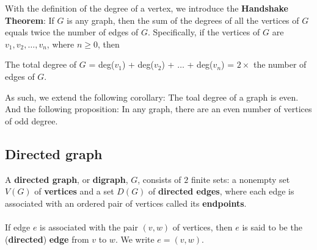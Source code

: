 \documentclass[a4paper]{article}
\begin{document}
With the definition of the degree of a vertex, we introduce the \textbf{Handshake Theorem}: If $G$ is any graph, then the sum of the degrees of all the vertices of $G$ equals twice the number of edges of $G$. Specifically, if the vertices of $G$ are $v_1, v_2, \dots, v_n$, where $n\ge 0$, then
\begin{center}
	The total degree of $G$ = deg($v_1$) + deg($v_2$) + $\dots$ + deg($v_n$) = $2 \times$ the number of edges of $G$.
\end{center}
As such, we extend the following corollary: The toal degree of a graph is even.\\
And the following proposition: In any graph, there are an even number of vertices of odd degree.

\subsection{Directed graph}
A \textbf{directed graph}, or \textbf{digraph}, $G$, consists of $2$ finite sets: a nonempty set $V(G)$ of \textbf{vertices} and a set $D(G)$ of \textbf{directed edges}, where each edge is associated with an ordered pair of vertices called its \textbf{endpoints}.\\\\
If edge $e$ is associated with the pair $(v,w)$ of vertices, then $e$ is said to be the (\textbf{directed}) \textbf{edge} from $v$ to $w$. We write $e=(v,w)$.
\end{document}
